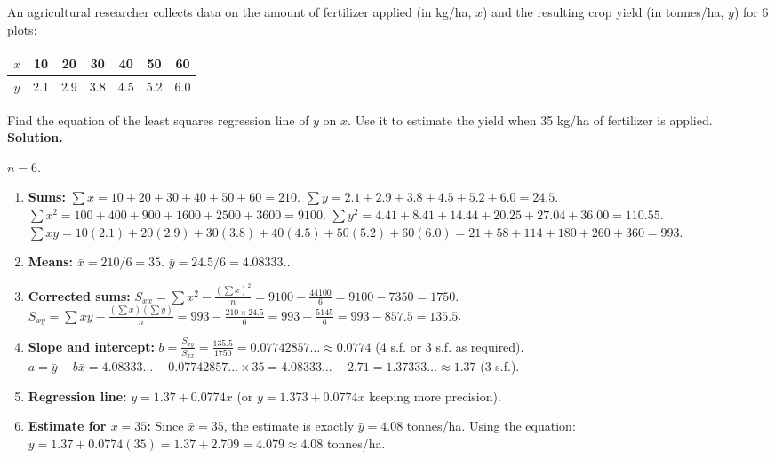 \documentclass[11pt]{article}
\begin{document}
\begin{exoresolu}
An agricultural researcher collects data on the amount of fertilizer applied (in kg/ha, $x$) and the resulting crop yield (in tonnes/ha, $y$) for 6 plots:

\begin{center}
\begin{tabular}{|c|c|c|c|c|c|c|}
\hline
$x$ & 10 & 20 & 30 & 40 & 50 & 60 \\
\hline
$y$ & 2.1 & 2.9 & 3.8 & 4.5 & 5.2 & 6.0 \\
\hline
\end{tabular}
\end{center}

Find the equation of the least squares regression line of $y$ on $x$. Use it to estimate the yield when 35 kg/ha of fertilizer is applied.
\tcblower
\textbf{Solution.}

$n=6$.

\begin{enumerate}
\item \textbf{Sums:}
$\sum x = 10+20+30+40+50+60 = 210$.
$\sum y = 2.1+2.9+3.8+4.5+5.2+6.0 = 24.5$.
$\sum x^2 = 100+400+900+1600+2500+3600 = 9100$.
$\sum y^2 = 4.41+8.41+14.44+20.25+27.04+36.00 = 110.55$.
$\sum xy = 10(2.1)+20(2.9)+30(3.8)+40(4.5)+50(5.2)+60(6.0) = 21+58+114+180+260+360 = 993$.

\item \textbf{Means:}
$\bar{x} = 210/6 = 35$.
$\bar{y} = 24.5/6 = 4.08333\ldots$

\item \textbf{Corrected sums:}
$S_{xx} = \sum x^2 - \frac{(\sum x)^2}{n} = 9100 - \frac{44100}{6} = 9100 - 7350 = 1750$.
$S_{xy} = \sum xy - \frac{(\sum x)(\sum y)}{n} = 993 - \frac{210\times24.5}{6} = 993 - \frac{5145}{6} = 993 - 857.5 = 135.5$.

\item \textbf{Slope and intercept:}
$b = \frac{S_{xy}}{S_{xx}} = \frac{135.5}{1750} = 0.07742857\ldots \approx 0.0774$ (4 s.f. or 3 s.f. as required).
$a = \bar{y} - b\bar{x} = 4.08333\ldots - 0.07742857\ldots \times 35 = 4.08333\ldots - 2.71 = 1.37333\ldots \approx 1.37$ (3 s.f.).

\item \textbf{Regression line:} $y = 1.37 + 0.0774x$ (or $y = 1.373 + 0.0774x$ keeping more precision).

\item \textbf{Estimate for $x=35$:} Since $\bar{x}=35$, the estimate is exactly $\bar{y} = 4.08$ tonnes/ha. Using the equation: $y = 1.37 + 0.0774(35) = 1.37 + 2.709 = 4.079 \approx 4.08$ tonnes/ha.
\end{enumerate}
\end{exoresolu}
\end{document}
